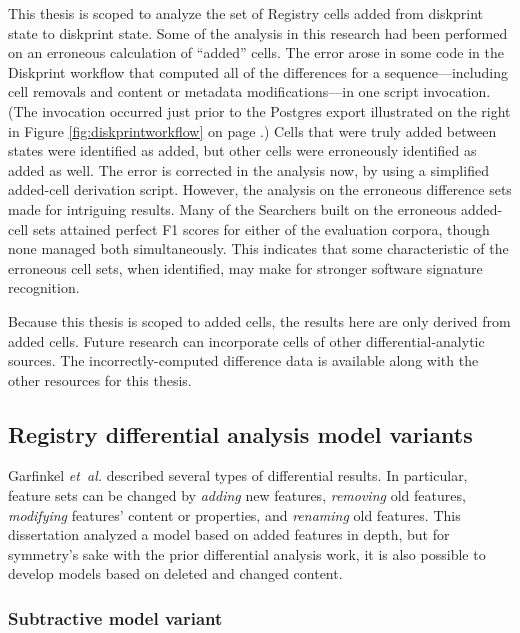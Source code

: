 \documentclass[11pt]{ucthesis}
\theoremstyle{plain}
\theoremstyle{definition}
\newcommand{\etal}{\emph{et~al.}\xspace}
\begin{document}
This thesis is scoped to analyze the set of Registry cells added from diskprint state to diskprint state.  Some of the analysis in this research had been performed on an erroneous calculation of ``added'' cells.  The error arose in some code in the Diskprint workflow that computed all of the differences for a sequence---including cell removals and content or metadata modifications---in one script invocation.  (The invocation occurred just prior to the Postgres export illustrated on the right in Figure \ref{fig:diskprintworkflow} on page \pageref{fig:diskprintworkflow}.)  Cells that were truly added between states were identified as added, but other cells were erroneously identified as added as well.  The error is corrected in the analysis now, by using a simplified added-cell derivation script.  However, the analysis on the erroneous difference sets made for intriguing results.  Many of the Searchers built on the erroneous added-cell sets attained perfect F1 scores for either of the evaluation corpora, though none managed both simultaneously.  This indicates that some characteristic of the erroneous cell sets, when identified, may make for stronger software signature recognition.

Because this thesis is scoped to added cells, the results here are only derived from added cells.  Future research can incorporate cells of other differential-analytic sources.  The incorrectly-computed difference data is available along with the other resources for this thesis.


\subsection{Registry differential analysis model variants}

Garfinkel \etal \cite{garfinkel:dfrws12a} described several types of differential results.  In particular, feature sets can be changed by \emph{adding} new features, \emph{removing} old features, \emph{modifying} features' content or properties, and \emph{renaming} old features.  This dissertation analyzed a model based on added features in depth, but for symmetry's sake with the prior differential analysis work, it is also possible to develop models based on deleted and changed content.


\subsubsection{Subtractive model variant}
\end{document}
